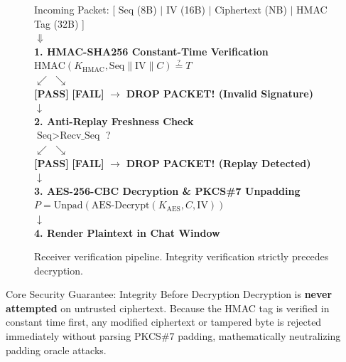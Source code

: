 \documentclass[11pt,a4paper]{article}
\begin{document}
\begin{figure}[H]
    \centering
    \begin{tcolorbox}[colback=lightbg, colframe=primaryblue, width=0.92\linewidth, center]
    \centering\footnotesize\ttfamily
    Incoming Packet: [ Seq (8B) $\vert$ IV (16B) $\vert$ Ciphertext (NB) $\vert$ HMAC Tag (32B) ] \\
    $\Downarrow$ \\
    \textbf{1. HMAC-SHA256 Constant-Time Verification} \\
    $\text{HMAC}(K_{\text{HMAC}}, \text{Seq} \parallel \text{IV} \parallel C) \stackrel{?}{=} T$ \\
    $\swarrow$ \hspace{2cm} $\searrow$ \\
    \textbf{[PASS]} \hspace{2.5cm} \textbf{[FAIL]} $\rightarrow$ \textcolor{alertred}{\textbf{DROP PACKET! (Invalid Signature)}} \\
    $\downarrow$ \\
    \textbf{2. Anti-Replay Freshness Check} \\
    $\text{Seq} > \text{Recv\_Seq}$ ? \\
    $\swarrow$ \hspace{2cm} $\searrow$ \\
    \textbf{[PASS]} \hspace{2.5cm} \textbf{[FAIL]} $\rightarrow$ \textcolor{alertred}{\textbf{DROP PACKET! (Replay Detected)}} \\
    $\downarrow$ \\
    \textbf{3. AES-256-CBC Decryption \& PKCS\#7 Unpadding} \\
    $P = \text{Unpad}(\text{AES-Decrypt}(K_{\text{AES}}, C, \text{IV}))$ \\
    $\downarrow$ \\
    \textbf{4. Render Plaintext in Chat Window}
    \end{tcolorbox}
    \caption{Receiver verification pipeline. Integrity verification strictly precedes decryption.}
    \label{fig:pipeline_flow}
\end{figure}

\begin{securitybox}{Core Security Guarantee: Integrity Before Decryption}
Decryption is \textbf{never attempted} on untrusted ciphertext. Because the HMAC tag is verified in constant time first, any modified ciphertext or tampered byte is rejected immediately without parsing PKCS\#7 padding, mathematically neutralizing padding oracle attacks.
\end{securitybox}
\end{document}
